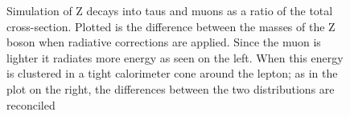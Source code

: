 \begin{figure}[h!]
  \centering
   \caption{Simulation of Z decays into taus and muons as a ratio of the total cross-section. Plotted is the difference between the masses of the Z boson when radiative corrections are applied. Since the muon is lighter it radiates more energy as seen on the left. When this energy is clustered in a tight calorimeter cone around the lepton; as in the plot on the right, the differences between the two distributions are reconciled}
  \label{fig:ysf}
\end{figure}
